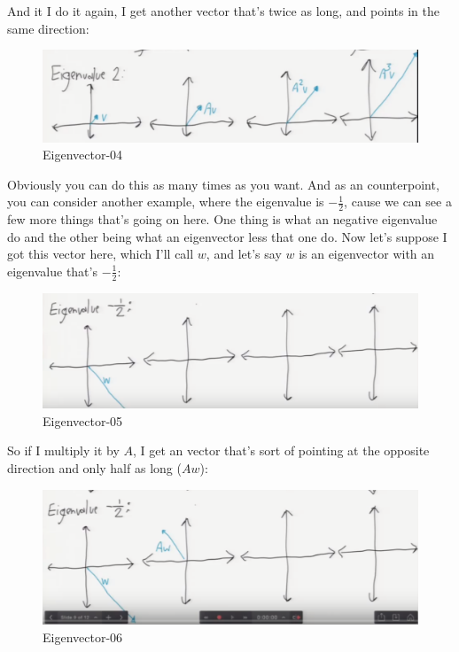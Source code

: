\documentclass[fleqn,10pt]{olplainarticle}
\theoremstyle{definition}
\theoremstyle{remark}
\begin{document}
And it I do it again, I get another vector that's twice as long, and points in the same direction:

\begin{figure}[ht]
\centering
\includegraphics[width=1.0\linewidth]{images/chpt08-04}
\caption{Eigenvector-04}
\label{fig:chpt08-04}
\end{figure}

Obviously you can do this as many times as you want. And as an counterpoint, you can consider another example, where the eigenvalue is $-\frac{1}{2}$, cause we can see a few more things that's going on here. One thing is what an negative eigenvalue do and the other being what an eigenvector less that one do. Now let's suppose I got this vector here, which I'll call $w$, and let's say $w$ is an eigenvector with an eigenvalue that's $-\frac{1}{2}$:

\begin{figure}[ht]
\centering
\includegraphics[width=1.0\linewidth]{images/chpt08-05}
\caption{Eigenvector-05}
\label{fig:chpt08-05}
\end{figure}
\clearpage

So if I multiply it by $A$, I get an vector that's sort of pointing at the opposite direction and only half as long ($Aw$): 

\begin{figure}[ht]
\centering
\includegraphics[width=1.0\linewidth]{images/chpt08-06}
\caption{Eigenvector-06}
\label{fig:chpt08-06}
\end{figure}
\end{document}
